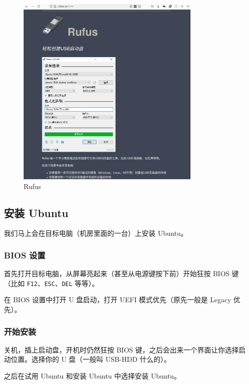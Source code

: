 \documentclass[UTF-8]{ctexart}
\begin{document}
				\begin{figure}[H]
					\centering
					\includegraphics[width=0.8\textwidth]{fig/rufus.png}
					\caption*{Rufus}
				\end{figure}
			
		\subsection{安装 Ubuntu}
		
			我们马上会在目标电脑（机房里面的一台）上安装 Ubuntu。
		
			\subsubsection{BIOS 设置}
			
				首先打开目标电脑，从屏幕亮起来（甚至从电源键按下前）开始狂按 BIOS 键（比如 \texttt{F12}、\texttt{ESC}、\texttt{DEL} 等等）。
				
				在 BIOS 设置中打开 U 盘启动，打开 UEFI 模式优先（原先一般是 Legacy 优先）。
			
			\subsubsection{开始安装}
				
				关机，插上启动盘，开机时仍然狂按 BIOS 键，之后会出来一个界面让你选择启动位置。选择你的 U 盘（一般叫 USB-HDD 什么的）。
				
				之后在试用 Ubuntu 和安装 Ubuntu 中选择安装 Ubuntu。
				
\end{document}
